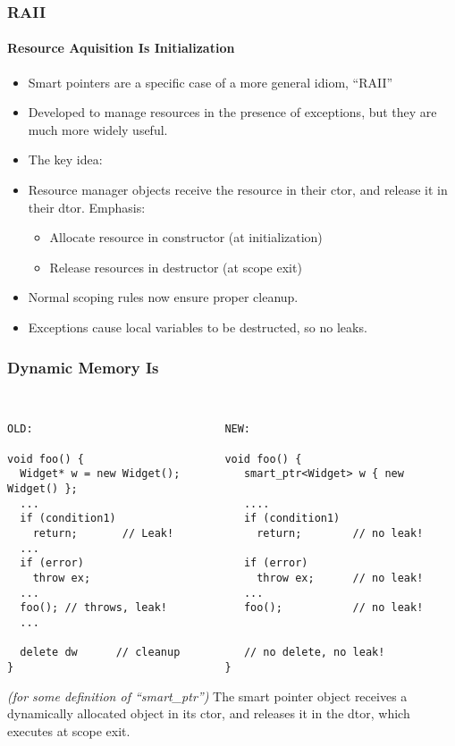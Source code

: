 \begin{frame}[fragile,t]
\frametitle{RAII}
\framesubtitle{Resource Aquisition Is Initialization}
\begin{itemize}
\item Smart pointers are a specific case of a more general idiom, ``RAII''
\item Developed to manage resources in the presence of exceptions, but
  they are much more widely useful.
\item The key idea:  
\item Resource manager objects receive the resource in their
  ctor, and release it in their dtor.  Emphasis:
\begin{itemize}
  \item Allocate resource in constructor (at initialization)
  \item Release resources in destructor (at scope exit)
\end{itemize}
\item Normal scoping rules now ensure proper cleanup.
\item Exceptions cause local variables to be destructed, so no leaks.
\end{itemize}
\vskip 12pt
\pause{}
\pause{}
\center{\Emph{\texttt{\}}}}

\end{frame}


\begin{frame}[fragile,t]
\frametitle{Dynamic Memory Is }
{\scriptsize\
\begin{verbatim}
OLD:                              NEW:

void foo() {                      void foo() {
  Widget* w = new Widget();          smart_ptr<Widget> w { new Widget() };
  ...                                ....
  if (condition1)                    if (condition1) 
    return;       // Leak!             return;        // no leak!
  ...
  if (error)                         if (error)
    throw ex;                          throw ex;      // no leak!
  ...                                ...
  foo(); // throws, leak!            foo();           // no leak!
  ...             

  delete dw      // cleanup          // no delete, no leak!
}                                 } 
\end{verbatim}
}

\emph{(for some definition of ``smart\_ptr'')}
\vskip 6pt
The smart pointer object receives a dynamically allocated object in
its ctor, and releases it in the dtor, which executes at scope exit.
\end{frame}

